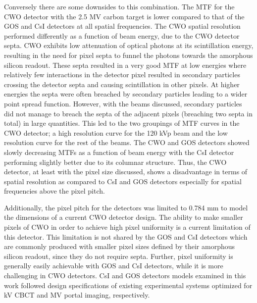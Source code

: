 Conversely there are some downsides to this combination. The MTF for the CWO detector with the 2.5 MV carbon target is lower compared to that of the GOS and CsI detectors at all spatial frequencies. The CWO spatial resolution performed differently as a function of beam energy, due to the CWO detector septa. CWO exhibits low attenuation of optical photons at its scintillation energy, resulting in the need for pixel septa to funnel the photons towards the amorphous silicon readout. These septa resulted in a very good MTF at low energies where relatively few interactions in the detector pixel resulted in secondary particles crossing the detector septa and causing scintillation in other pixels. At higher energies the septa were often breached by secondary particles leading to a wider point spread function. However, with the beams discussed, secondary particles did not manage to breach the septa of the adjacent pixels (breaching two septa in total) in large quantities. This led to the two groupings of MTF curves in the CWO detector; a high resolution curve for the 120 kVp beam and the low resolution curve for the rest of the beams. The CWO and GOS detectors showed slowly decreasing MTFs as a function of beam energy with the CsI detector performing slightly better due to its columnar structure. Thus, the CWO detector, at least with the pixel size discussed, shows a disadvantage in terms of spatial resolution as compared to CsI and GOS detectors especially for spatial frequencies above the pixel pitch.


Additionally, the pixel pitch for the detectors was limited to 0.784 mm to model the dimensions of a current CWO detector design\cite{Star-Lack2015AImaging}. The ability to make smaller pixels of CWO in order to achieve high pixel uniformity is a current limitation of this detector\cite{Lindsay2019InvestigationDetector}. This limitation is not shared by the GOS and CsI detectors which are commonly produced with smaller pixel sizes defined by their amorphous silicon readout, since they do not require septa. Further, pixel uniformity is generally easily achievable with GOS and CsI detectors, while it is more challenging in CWO detectors. CsI and GOS detectors models examined in this work followed design specifications of existing experimental systems optimized for kV CBCT and MV portal imaging, respectively.

